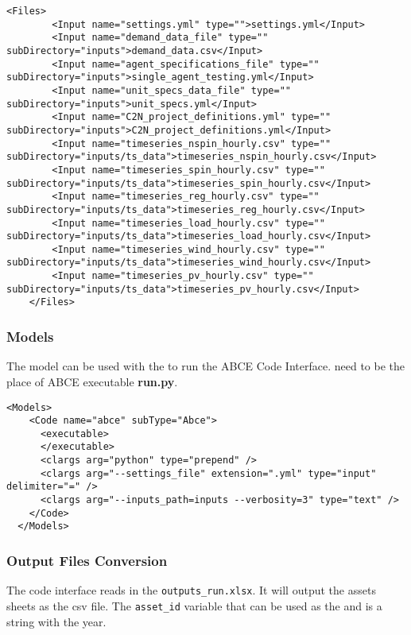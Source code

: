 \begin{itemize}
\begin{lstlisting}[style=XML]
    <Files>
        <Input name="settings.yml" type="">settings.yml</Input>
        <Input name="demand_data_file" type="" subDirectory="inputs">demand_data.csv</Input>
        <Input name="agent_specifications_file" type="" subDirectory="inputs">single_agent_testing.yml</Input>
        <Input name="unit_specs_data_file" type="" subDirectory="inputs">unit_specs.yml</Input>
        <Input name="C2N_project_definitions.yml" type="" subDirectory="inputs">C2N_project_definitions.yml</Input>
        <Input name="timeseries_nspin_hourly.csv" type="" subDirectory="inputs/ts_data">timeseries_nspin_hourly.csv</Input>
        <Input name="timeseries_spin_hourly.csv" type="" subDirectory="inputs/ts_data">timeseries_spin_hourly.csv</Input>
        <Input name="timeseries_reg_hourly.csv" type="" subDirectory="inputs/ts_data">timeseries_reg_hourly.csv</Input>
        <Input name="timeseries_load_hourly.csv" type="" subDirectory="inputs/ts_data">timeseries_load_hourly.csv</Input>
        <Input name="timeseries_wind_hourly.csv" type="" subDirectory="inputs/ts_data">timeseries_wind_hourly.csv</Input>
        <Input name="timeseries_pv_hourly.csv" type="" subDirectory="inputs/ts_data">timeseries_pv_hourly.csv</Input>
    </Files>
\end{lstlisting}

\subsubsection{Models}

The  model can be used with the
 to run the ABCE Code Interface.  need to be the place of ABCE executable \textbf{run.py}.

\begin{lstlisting}[style=XML]
  <Models>
    <Code name="abce" subType="Abce">
      <executable>
      </executable>
      <clargs arg="python" type="prepend" />
      <clargs arg="--settings_file" extension=".yml" type="input" delimiter="=" />
      <clargs arg="--inputs_path=inputs --verbosity=3" type="text" />
    </Code>
  </Models>
\end{lstlisting}

\subsubsection{Output Files Conversion}

The code interface reads in the \texttt{outputs\ABCE_run\outputs.xlsx}. 
It will output the assets sheets as the csv file. The \texttt{asset_id} 
variable that can be used as the  and is a
string with the year. 


\end{itemize}
